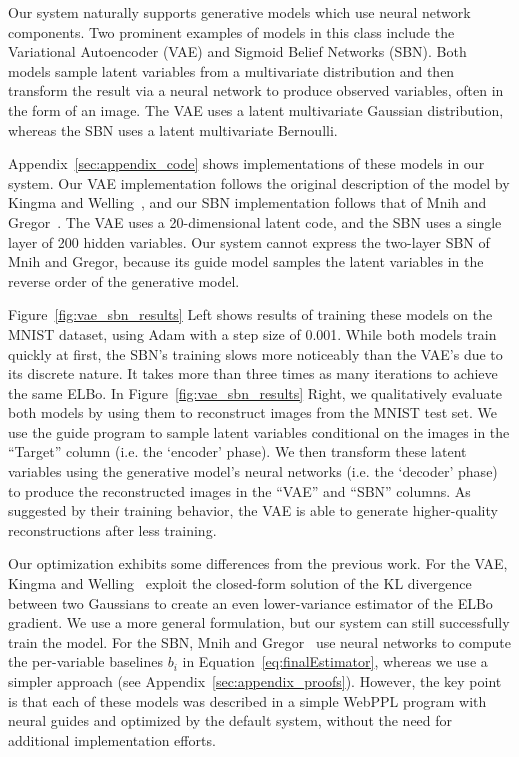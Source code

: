 Our system naturally supports generative models which use neural network components. Two prominent examples of models in this class include the Variational Autoencoder (VAE) and Sigmoid Belief Networks (SBN). Both models sample latent variables from a multivariate distribution and then transform the result via a neural network to produce observed variables, often in the form of an image. The VAE uses a latent multivariate Gaussian distribution, whereas the SBN uses a latent multivariate Bernoulli.

Appendix~\ref{sec:appendix_code} shows implementations of these models in our system. Our VAE implementation follows the original description of the model by Kingma and Welling~\cite{AEVB}, and our SBN implementation follows that of Mnih and Gregor~\cite{NVIL}.
The VAE uses a 20-dimensional latent code, and the SBN uses a single layer of 200 hidden variables. Our system cannot express the two-layer SBN of Mnih and Gregor, because its guide model samples the latent variables in the reverse order of the generative model.

Figure~\ref{fig:vae_sbn_results} Left shows results of training these models on the MNIST dataset, using Adam with a step size of 0.001.
While both models train quickly at first, the SBN's training slows more noticeably than the VAE's due to its discrete nature. It takes more than three times as many iterations to achieve the same ELBo.
In Figure~\ref{fig:vae_sbn_results} Right, we qualitatively evaluate both models by using them to reconstruct images from the MNIST test set. We use the guide program to sample latent variables conditional on the images in the ``Target'' column (i.e. the `encoder' phase). We then transform these latent variables using the generative model's neural networks (i.e. the `decoder' phase) to produce the reconstructed images in the ``VAE'' and ``SBN'' columns.
As suggested by their training behavior, the VAE is able to generate higher-quality reconstructions after less training.

Our optimization exhibits some differences from the previous work.
For the VAE, Kingma and Welling~\cite{AEVB} exploit the closed-form solution of the KL divergence between two Gaussians to create an even lower-variance estimator of the ELBo gradient. We use a more general formulation, but our system can still successfully train the model.
For the SBN, Mnih and Gregor~\cite{NVIL} use neural networks to compute the per-variable baselines $b_i$ in Equation~\ref{eq:finalEstimator}, whereas we use a simpler approach (see Appendix~\ref{sec:appendix_proofs}).
However, the key point is that each of these models was described in a simple WebPPL program with neural guides and optimized by the default system, without the need for additional implementation efforts.

